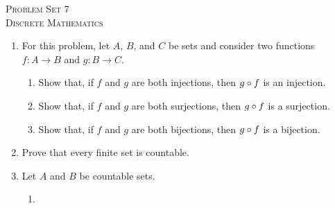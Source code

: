 




\begin{center}
    \textsc{\huge Problem Set 7}\\
    \textsc{Discrete Mathematics}\\
\end{center}

\begin{enumerate}
    \item
        For this problem, let $A$, $B$, and $C$ be sets and consider two functions $f: A \to B$ and $g: B \to C$.
        \begin{enumerate}
            \item
                Show that, if $f$ and $g$ are both injections, then $g \circ f$ is an injection.
            \item
                Show that, if $f$ and $g$ are both surjections, then $g \circ f$ is a surjection.
            \item
                Show that, if $f$ and $g$ are both bijections, then $g \circ f$ is a bijection.
        \end{enumerate}
    \item
        Prove that every finite set is countable.
    \item
        Let $A$ and $B$ be countable sets.
        \begin{enumerate}
            \item

\end{enumerate}
\end{enumerate}

